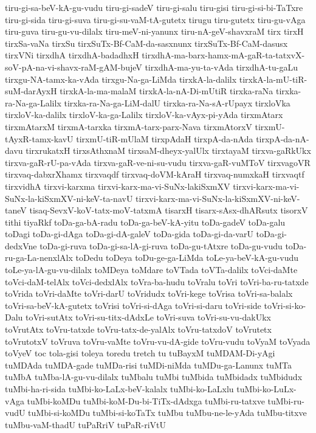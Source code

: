 {tiru-gi-sa-beV-kA-gu-vudu
tiru-gi-sadeV
tiru-gi-salu
tiru-gisi
tiru-gi-si-bi-TaTxre
tiru-gi-sida
tiru-gi-suva
tiru-gi-su-vaM-tA-gutetx
tirugu
tiru-gutetx
tiru-gu-vAga
tiru-guva
tiru-gu-vu-dilalx
tiru-meV-ni-yanunx
tiru-nA-geV-shavxraM
tirx
tirxH
tirxSa-vaNa
tirxSu
tirxSuTx-Bf-CaM-da-sasxnunx
tirxSuTx-Bf-CaM-dasusx
tirxVNi
tirxdhA
tirxdhA-badadhxH
tirxdhA-ma-barx-hamx-mA-gaR-ta-tatxvX-soV-pA-na-vi-shavx-raM-gAM-bujeV
tirxdhA-ma-yu-ta-vAda
tirxdhA-tu-gaLu
tirxgu-NA-tamx-ka-vAda
tirxgu-Na-ga-LiMda
tirxkA-la-dalilx
tirxkA-la-mU-tiR-suM-darAyxH
tirxkA-la-ma-malaM
tirxkA-la-nA-Di-mUtiR
tirxka-raNa
tirxka-ra-Na-ga-Lalilx
tirxka-ra-Na-ga-LiM-dalU
tirxka-ra-Na-sA-rUpayx
tirxloVka
tirxloV-ka-dalilx
tirxloV-ka-ga-Lalilx
tirxloV-ka-vAyx-pi-yAda
tirxmAtarx
tirxmAtarxM
tirxmA-tarxka
tirxmA-tarx-parx-Nava
tirxmAtorxV
tirxmU-tAyxR-tamx-kavU
tirxmU-tiR-mUlaM
tirxpAdaH
tirxpA-da-nAda
tirxpA-da-nA-davu
tirxrukatxH
tirxsAthxnaM
tirxsaM-dheyx-yalUlx
tirxtayaM
tirxva-gaRkUkx
tirxva-gaR-rU-pa-vAda
tirxva-gaR-ve-ni-su-vudu
tirxva-gaR-vuMToV
tirxvagoVR
tirxvaq-dabxrXhamx
tirxvaqdf
tirxvaq-doVM-kAraH
tirxvaq-numxkaH
tirxvaqtf
tirxvidhA
tirxvi-karxma
tirxvi-karx-ma-vi-SuNx-lakiSxmXV
tirxvi-karx-ma-vi-SuNx-la-kiSxmXV-ni-keV-ta-navU
tirxvi-karx-ma-vi-SuNx-la-kiSxmXV-ni-keV-taneV
tisaq-SevxV-koV-tatx-moV-tatxmA
tisarxH
tisarx-sAsx-dhARsutx
tisorxV
tithi
tiyaRkf
toDa-ga-bA-radu
toDa-ga-beV-kA-yitu
toDa-gadeV
toDa-galu
toDagi
toDa-gi-dAga
toDa-gi-dA-galeV
toDa-gida
toDa-gi-da-varU
toDa-gi-dedxVne
toDa-gi-ruva
toDa-gi-sa-lA-gi-ruva
toDa-gu-tAtxre
toDa-gu-vudu
toDa-ru-ga-La-nenxlAlx
toDedu
toDeya
toDu-ge-ga-LiMda
toLe-ya-beV-kA-gu-vudu
toLe-ya-lA-gu-vu-dilalx
toMDeya
toMdare
toVTada
toVTa-dalilx
toVci-daMte
toVci-daM-telAlx
toVci-dedxlAlx
toVra-ba-hudu
toVralu
toVri
toVri-ba-ru-tatxde
toVrida
toVri-daMte
toVri-darU
toVridudx
toVri-kege
toVrisa
toVri-sa-balalx
toVri-sa-beV-kA-gutetx
toVrisi
toVri-si-dAga
toVri-si-daru
toVri-side
toVri-si-ko-Dalu
toVri-sutAtx
toVri-su-titx-dAdxLe
toVri-suva
toVri-su-vu-dakUkx
toVrutAtx
toVru-tatxde
toVru-tatx-de-yalAlx
toVru-tatxdoV
toVrutetx
toVrutotxV
toVruva
toVru-vaMte
toVru-vu-dA-gide
toVru-vudu
toVyaM
toVyada
toVyeV
toc
tola-gisi
toleya
toredu
tretch
tu
tuBayxM
tuMDAM-Di-yAgi
tuMDAda
tuMDA-gade
tuMDa-risi
tuMDi-niMda
tuMDu-ga-Lanunx
tuMTa
tuMbA
tuMba-lA-gu-vu-dilalx
tuMbalu
tuMbi
tuMbida
tuMbidadx
tuMbidudx
tuMbi-ha-ri-sida
tuMbi-ko-LaLx-beV-kalalx
tuMbi-ko-LaLxlu
tuMbi-ko-LuLx-vAga
tuMbi-koMDu
tuMbi-koM-Du-bi-TiTx-dAdxga
tuMbi-ru-tatxve
tuMbi-ru-vudU
tuMbi-si-koMDu
tuMbi-si-koTaTx
tuMbu
tuMbu-ne-le-yAda
tuMbu-titxve
tuMbu-vaM-thadU
tuPaRriV
tuPaR-riVtU
}

